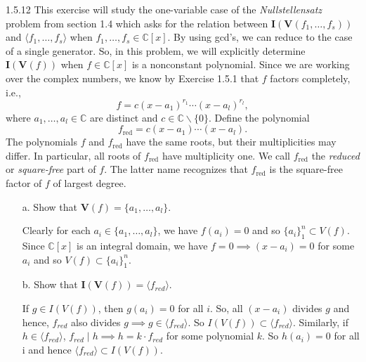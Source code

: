 \documentclass[12pt]{article}
\begin{document}
1.5.12
This exercise will study the one-variable case of the
\textit{Nullstellensatz} problem from section 1.4
which asks for the relation between
$\mathbf{I}(\mathbf{V}(f_1,\ldots,f_s))$ and
$\langle f_1,\ldots, f_s\rangle$ when
$f_1,\ldots, f_s\in \mathbb{C}[x]$.
By using gcd's, we can reduce to the case of a single
generator. So, in this problem, we will explicitly determine $\mathbf{I}(\mathbf{V}(f))$ when $f\in \mathbb{C}[x]$ is a nonconstant polynomial. Since we are working over the complex numbers, we know by Exercise 1.5.1 that $f$ factors completely, i.e.,
$$f=c(x-a_1)^{r_1}\cdots (x-a_l)^{r_l},$$ where $a_1,\ldots, a_l\in \mathbb{C}$ are distinct and $c\in \mathbb{C}\backslash \{0\}$. Define the polynomial $$f_{\text{red}}=c(x-a_1)\cdots (x-a_l).$$
The polynomials $f$ and $f_{\text{red}}$ have the same
roots, but their multiplicities may differ. In particular,
all roots of $f_{\text{red}}$ have multiplicity one.
We call $f_{\text{red}}$ the \textit{reduced} or \textit{square-free}
part of $f$. The latter name recognizes that
$f_{\text{red}}$ is the square-free factor of $f$ of largest degree.
\begin{enumerate}
    \item[a.] Show that $\mathbf{V}(f)=\{a_1,\ldots, a_l\}.$
    \begin{mybox}
        Clearly for each $a_i\in \{a_1,\ldots, a_l\}$,
        we have $f(a_i)=0$ and so $\{a_i\}_1^n\subset
        V(f)$.
        Since $\mathbb{C}[x]$ is an integral domain,
        we have $f=0\implies (x-a_i)=0$ for some $a_i$
        and so $V(f)\subset \{a_i\}_1^n$.
    \end{mybox}
    \item[b.] Show that  $\mathbf{I}(\mathbf{V}(f))= \langle f_{red} \rangle$.
    \begin{mybox}
        If $g\in I(V(f))$, then $g(a_i)=0$ for all $i$. So,
        all $(x-a_i)$ divides $g$ and hence, $f_{red}$
        also divides $g \implies g\in \langle f_{red}\rangle$.
        So $I(V(f))\subset \langle f_{red}\rangle$.
        Similarly, if $h\in\langle f_{red}\rangle$, $f_{red}
        \mid h\implies h=k\cdot f_{red}$ for some polynomial
        $k$. So $h(a_i)=0$ for all i and hence
        $\langle f_{red}\rangle \subset I(V(f))$.
    \end{mybox}
\end{enumerate}
\end{document}
